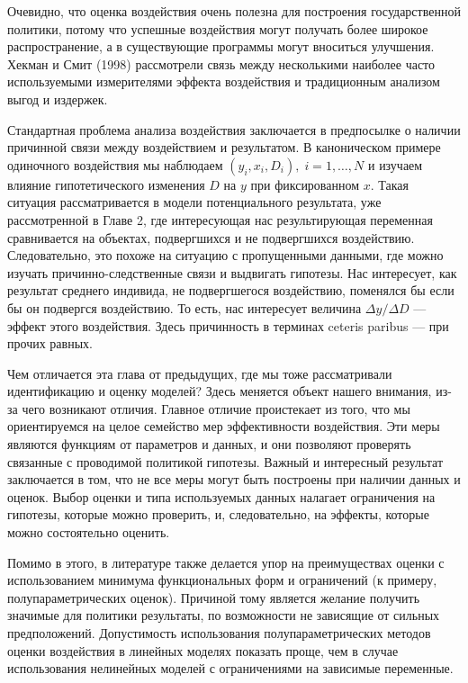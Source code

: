 Очевидно, что оценка воздействия очень полезна для построения государственной политики, потому что успешные воздействия могут получать более широкое распространение, а в существующие программы могут вноситься улучшения. Хекман и Смит (1998) рассмотрели связь между несколькими наиболее часто используемыми измерителями эффекта воздействия и традиционным анализом выгод и издержек. 

Стандартная проблема анализа воздействия заключается в предпосылке о наличии причинной связи между воздействием и результатом. В каноническом примере одиночного воздействия мы наблюдаем $(y_i, x_i, D_i), \; i = 1, \dots, N$ и изучаем влияние гипотетического изменения $D$ на $y$ при фиксированном $x$. Такая ситуация рассматривается в модели потенциального результата, уже рассмотренной в Главе 2, где интересующая нас результирующая переменная сравнивается на объектах, подвергшихся и не подвергшихся воздействию. Следовательно, это похоже на ситуацию с пропущенными данными, где можно изучать причинно-следственные связи и выдвигать гипотезы. Нас интересует, как результат среднего индивида, не подвергшегося воздействию, поменялся бы если бы он подвергся воздействию. То есть, нас интересует величина $\Delta y / \Delta D$ --- эффект этого воздействия. Здесь причинность в терминах ceteris paribus --- при прочих равных. 

Чем отличается эта глава от предыдущих, где мы тоже рассматривали идентификацию и оценку моделей? Здесь меняется объект нашего внимания, из-за чего возникают отличия. Главное отличие проистекает из того, что мы ориентируемся на целое семейство мер эффективности воздействия. Эти меры являются функциям от параметров и данных, и они позволяют проверять связанные с проводимой политикой гипотезы. Важный и интересный результат заключается в том, что не все меры могут быть построены при наличии данных и оценок. Выбор оценки и типа используемых данных налагает ограничения на гипотезы, которые можно проверить, и, следовательно, на эффекты, которые можно состоятельно оценить. 

Помимо в этого, в литературе также делается упор на преимуществах оценки с использованием минимума функциональных форм и ограничений (к примеру, полупараметрических оценок). Причиной тому является желание получить значимые для политики результаты, по возможности не зависящие от сильных предположений. Допустимость использования полупараметрических методов оценки воздействия в линейных моделях показать проще, чем в случае использования нелинейных моделей с ограничениями на зависимые переменные. 

